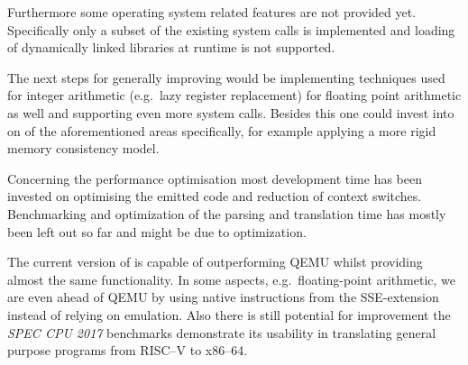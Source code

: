 Furthermore some operating system related features are not provided yet.
Specifically only a subset of the existing system calls is implemented and loading of dynamically linked libraries at runtime is not supported.

The next steps for generally improving \translatorname would be implementing techniques used for integer arithmetic (e.g.\ lazy register replacement) for floating point arithmetic as well and supporting even more system calls.
Besides this one could invest into on of the aforementioned areas specifically, for example applying a more rigid memory consistency model. %

Concerning the performance optimisation most development time has been invested on optimising the emitted code and reduction of context switches.
Benchmarking and optimization of the parsing and translation time has mostly been left out so far and might be due to optimization.


The current version of \translatorname is capable of outperforming QEMU whilst providing almost the same functionality.
In some aspects, e.g.\ floating-point arithmetic, we are even ahead of QEMU by using native instructions from the SSE-extension instead of relying on emulation.
Also there is still potential for improvement the \textit{SPEC CPU 2017} benchmarks demonstrate its usability in translating general purpose programs from RISC--V to x86--64. %